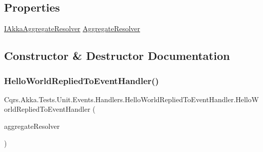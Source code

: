 \subsection*{Properties}
\begin{DoxyCompactItemize}
\item 
\hyperlink{interfaceCqrs_1_1Akka_1_1Domain_1_1IAkkaAggregateResolver}{I\+Akka\+Aggregate\+Resolver} \hyperlink{classCqrs_1_1Akka_1_1Tests_1_1Unit_1_1Events_1_1Handlers_1_1HelloWorldRepliedToEventHandler_aead9e7b0edae372414fffea474407514_aead9e7b0edae372414fffea474407514}{Aggregate\+Resolver}
\end{DoxyCompactItemize}


\subsection{Constructor \& Destructor Documentation}
\mbox{\label{classCqrs_1_1Akka_1_1Tests_1_1Unit_1_1Events_1_1Handlers_1_1HelloWorldRepliedToEventHandler_aa566f26a38bc21ed270a1854de47408d_aa566f26a38bc21ed270a1854de47408d}} 
\subsubsection{\texorpdfstring{Hello\+World\+Replied\+To\+Event\+Handler()}{HelloWorldRepliedToEventHandler()}}
{\footnotesize\ttfamily Cqrs.\+Akka.\+Tests.\+Unit.\+Events.\+Handlers.\+Hello\+World\+Replied\+To\+Event\+Handler.\+Hello\+World\+Replied\+To\+Event\+Handler (\begin{DoxyParamCaption}\item[{\hyperlink{interfaceCqrs_1_1Akka_1_1Domain_1_1IAkkaAggregateResolver}{I\+Akka\+Aggregate\+Resolver}}]{aggregate\+Resolver }\end{DoxyParamCaption})}



